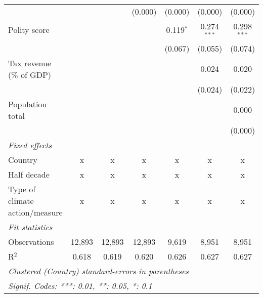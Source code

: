 \begin{tabular}{lcccccc}
                                                                               &         &                & (0.000)        & (0.000)        & (0.000)        & (0.000)\\   
   Polity score                                                                &         &                &                & 0.119$^{*}$    & 0.274$^{***}$  & 0.298$^{***}$\\   
                                                                               &         &                &                & (0.067)        & (0.055)        & (0.074)\\   
   Tax revenue (\% of GDP)                                                     &         &                &                &                & 0.024          & 0.020\\   
                                                                               &         &                &                &                & (0.024)        & (0.022)\\   
   Population total                                                            &         &                &                &                &                & 0.000\\   
                                                                               &         &                &                &                &                & (0.000)\\   
   \emph{Fixed effects}\\
   Country                                                                     & x       & x              & x              & x              & x              & x\\  
   Half decade                                                                 & x       & x              & x              & x              & x              & x\\  
   Type of climate action/measure                                              & x       & x              & x              & x              & x              & x\\  
   \midrule \emph{Fit statistics}\\
   Observations                                                                & 12,893  & 12,893         & 12,893         & 9,619          & 8,951          & 8,951\\  
   R$^2$                                                                       & 0.618   & 0.619          & 0.620          & 0.626          & 0.627          & 0.627\\  
   \midrule
   \multicolumn{7}{l}{\emph{Clustered (Country) standard-errors in parentheses}}\\
   \multicolumn{7}{l}{\emph{Signif. Codes: ***: 0.01, **: 0.05, *: 0.1}}\\
\end{tabular}
\par\endgroup



